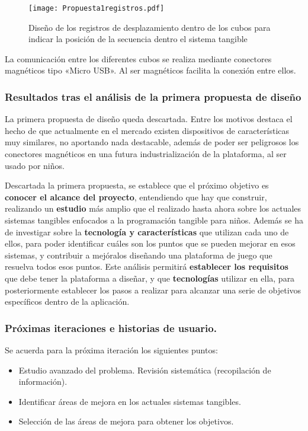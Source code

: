 \begin{figure}[!h]
\begin{center}
\texttt{[image: Propuesta1registros.pdf]}
\caption{Diseño de los registros de desplazamiento dentro de los cubos para indicar la posición de la secuencia dentro el sistema tangible}
\label{fig:Propuesta1registros}
\end{center}
\end{figure}

La comunicación entre los diferentes cubos se realiza mediante conectores magnéticos tipo «Micro USB». Al ser magnéticos facilita la conexión entre ellos.

\subsubsection{Resultados tras el análisis de la primera propuesta de diseño}

La primera propuesta de diseño queda descartada. Entre los motivos destaca el hecho de que actualmente en el mercado existen dispositivos de características muy similares, no aportando nada destacable, además de poder ser peligrosos los conectores magnéticos en una futura industrialización de la plataforma, al ser usado por niños.

Descartada la primera propuesta, se establece que el próximo objetivo es \textbf{ conocer el alcance del proyecto}, entendiendo que hay que construir, realizando un \textbf{estudio} más amplio que el realizado hasta ahora sobre los actuales sistemas tangibles enfocados a la programación tangible para niños. Además se ha de investigar sobre la \textbf{tecnología y características} que utilizan cada uno de ellos, para poder identificar cuáles son los puntos que se pueden mejorar en esos sistemas, y contribuir a mejóralos diseñando una plataforma de juego que resuelva todos esos puntos. Este análisis permitirá \textbf{establecer los requisitos} que debe tener la plataforma a diseñar, y que \textbf{tecnologías} utilizar en ella, para posteriormente establecer los pasos a realizar para alcanzar una serie de objetivos específicos dentro de la aplicación.\

\subsubsection{Próximas iteraciones e historias de usuario.}
Se acuerda para la próxima iteración los siguientes puntos:
\begin{itemize}
\item Estudio avanzado del problema. Revisión sistemática (recopilación de información).
\item Identificar áreas de mejora en los actuales sistemas tangibles.
\item Selección de las áreas de mejora para obtener los objetivos.
\end{itemize}


